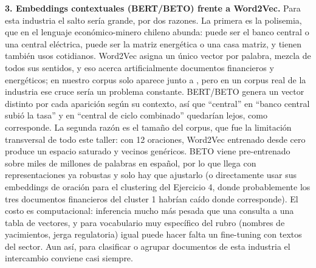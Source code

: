 \textbf{3. Embeddings contextuales (BERT/BETO) frente a Word2Vec.} Para esta industria el salto sería grande, por dos razones. La primera es la polisemia, que en el lenguaje económico-minero chileno abunda:  puede ser el banco central o una central eléctrica,  puede ser la matriz energética o una casa matriz,  y  tienen también usos cotidianos. Word2Vec asigna un único vector por palabra, mezcla de todos sus sentidos, y eso acerca artificialmente documentos financieros y energéticos; en nuestro corpus  solo aparece junto a , pero en un corpus real de la industria ese cruce sería un problema constante. BERT/BETO genera un vector distinto por cada aparición según su contexto, así que ``central'' en ``banco central subió la tasa'' y en ``central de ciclo combinado'' quedarían lejos, como corresponde. La segunda razón es el tamaño del corpus, que fue la limitación transversal de todo este taller: con 12 oraciones, Word2Vec entrenado desde cero produce un espacio saturado y vecinos genéricos. BETO viene pre-entrenado sobre miles de millones de palabras en español, por lo que llega con representaciones ya robustas y solo hay que ajustarlo (o directamente usar sus embeddings de oración para el clustering del Ejercicio 4, donde probablemente los tres documentos financieros del cluster 1 habrían caído donde corresponde). El costo es computacional: inferencia mucho más pesada que una consulta a una tabla de vectores, y para vocabulario muy específico del rubro (nombres de yacimientos, jerga regulatoria) igual puede hacer falta un fine-tuning con textos del sector. Aun así, para clasificar o agrupar documentos de esta industria el intercambio conviene casi siempre.
